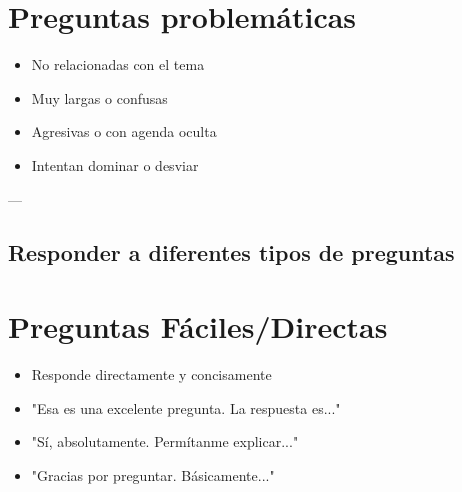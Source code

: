 \documentclass[a4paper,11pt]{article}
\begin{document}
\vspace{0.2cm}

\section{Preguntas problemáticas}

\begin{itemize}

  \item No relacionadas con el tema

  \item Muy largas o confusas

  \item Agresivas o con agenda oculta

  \item Intentan dominar o desviar

\end{itemize}

\vspace{0.2cm}

---

\vspace{0.2cm}

\subsection{Responder a diferentes tipos de preguntas}

\vspace{0.2cm}

\section{Preguntas Fáciles/Directas}

\begin{itemize}

  \item Responde directamente y concisamente

  \item "Esa es una excelente pregunta. La respuesta es..."

  \item "Sí, absolutamente. Permítanme explicar..."

  \item "Gracias por preguntar. Básicamente..."

\end{itemize}

\vspace{0.2cm}
\end{document}
